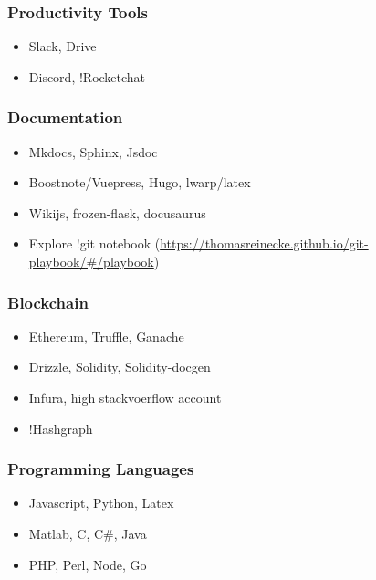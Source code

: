\subsubsection{Productivity Tools}\label{productivity-tools}

\begin{itemize}

\item
  Slack, Drive
\item
  Discord, !Rocketchat
\end{itemize}


\subsubsection{Documentation}\label{documentation}

\begin{itemize}

\item
  Mkdocs, Sphinx, Jsdoc
\item
  Boostnote/Vuepress, Hugo, lwarp/latex
\item
  Wikijs, frozen-flask, docusaurus
\item
  Explore !git notebook
  (\url{https://thomasreinecke.github.io/git-playbook/\#/playbook})
\end{itemize}


\subsubsection{Blockchain}\label{blockchain}

\begin{itemize}

\item
  Ethereum, Truffle, Ganache
\item
  Drizzle, Solidity, Solidity-docgen
\item
  Infura, high stackvoerflow account
\item
  !Hashgraph
\end{itemize}


\subsubsection{Programming Languages}\label{programming-languages}

\begin{itemize}

\item
  Javascript, Python, Latex
\item
  Matlab, C, C\#, Java
\item
  PHP, Perl, Node, Go
\end{itemize}

